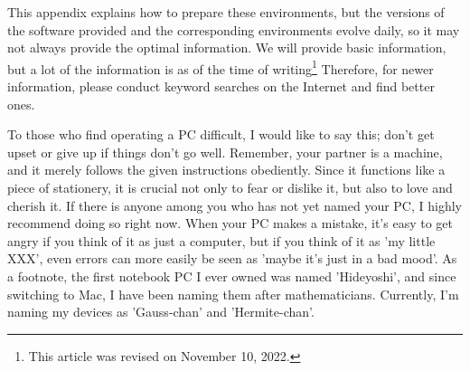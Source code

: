 \documentclass{ltjsbook}
\begin{document}
This appendix explains how to prepare these environments, but the versions of the software provided and the corresponding environments evolve daily, so it may not always provide the optimal information. We will provide basic information, but a lot of the information is as of the time of writing\footnote{This article was revised on November 10, 2022.} Therefore, for newer information, please conduct keyword searches on the Internet and find better ones.

To those who find operating a PC difficult, I would like to say this; don't get upset or give up if things don't go well. Remember, your partner is a machine, and it merely follows the given instructions obediently. Since it functions like a piece of stationery, it is crucial not only to fear or dislike it, but also to love and cherish it. If there is anyone among you who has not yet named your PC, I highly recommend doing so right now. When your PC makes a mistake, it's easy to get angry if you think of it as just a computer, but if you think of it as 'my little XXX', even errors can more easily be seen as 'maybe it’s just in a bad mood'. As a footnote, the first notebook PC I ever owned was named 'Hideyoshi', and since switching to Mac, I have been naming them after mathematicians. Currently, I'm naming my devices as 'Gauss-chan' and 'Hermite-chan'.
\end{document}
